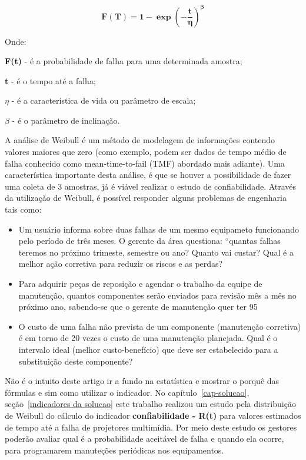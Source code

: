 \begin{equation}
\label{eqn01}
	\mathbf{F(T)} = \mathbf{1} - \mathbf{\exp{(-\frac{t}{\eta})^\beta}} 
\end{equation}

Onde:

\textbf{F(t)} - é a probabilidade de falha para uma determinada amostra;

\textbf{t} - é o tempo até a falha;

$ \eta $ - é a característica de vida ou parâmetro de escala;

$ \beta $ - é o parâmetro de inclinação.

\pagebreak

A análise de Weibull é um método de modelagem de informações contendo valores maiores que zero (como exemplo, podem ser dados de tempo médio de falha conhecido como mean-time-to-fail (TMF) abordado mais adiante). Uma característica importante desta análise, é que se houver a possibilidade de fazer uma coleta de 3 amostras, já é viável realizar o estudo de confiabilidade. Através da utilização de Weibull, é possível responder alguns problemas de engenharia tais como:

\begin{itemize}
	\item Um usuário informa sobre duas falhas de um mesmo equipameto funcionando pelo período de três meses. O gerente da área questiona: “quantas falhas teremos no próximo trimeste, semestre ou ano? Quanto vai custar? Qual é a melhor ação corretiva para reduzir os riscos e as perdas?
	\item Para adquirir peças de reposição e agendar o trabalho da equipe de manutenção, quantos componentes serão enviados para revisão mês a mês no próximo ano, sabendo-se que o gerente de manutenção quer ter 95%
	\item O custo de uma falha não prevista de um componente (manutenção corretiva) é em torno de 20 vezes o custo de uma manutenção planejada. Qual é o intervalo ideal (melhor custo-benefício) que deve ser estabelecido para a substituição deste componente?
	\end{itemize}

Não é o intuito deste artigo ir a fundo na estatística e mostrar o porquê das fórmulas e sim como utilizar o indicador. No capítulo~\ref{cap-solucao}, seção~\ref{indicadores da solucao} este trabalho realizou um estudo pela distribuição de Weibull do cálculo do indicador \textbf{confiabilidade - R(t)} para valores estimados de tempo até a falha de projetores multimídia. Por meio deste estudo os gestores poderão avaliar qual é a probabilidade aceitável de falha e quando ela ocorre, para programarem manuteções periódicas nos equipamentos.


